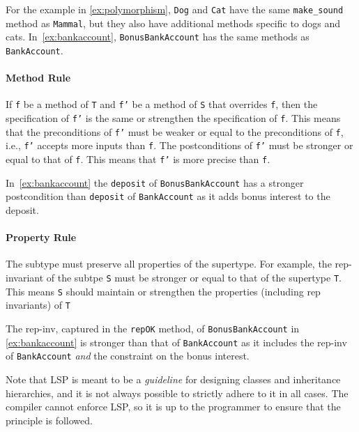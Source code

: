 \documentclass[oneside,11pt,dvipsnames]{book}
\newcommand{\code}[1]{\texttt{#1}}
\begin{document}
For the example in \autoref{ex:polymorphism}, \code{Dog} and \code{Cat} have the same \code{make\_sound} method as \code{Mammal}, but they also have additional methods specific to dogs and cats.
In~\autoref{ex:bankaccount}, \code{BonusBankAccount} has the same methods as \code{BankAccount}.

\paragraph{Method Rule} 
If \code{f} be a method of \code{T} and \code{f'} be a method of \code{S} that overrides \code{f}, then 
the specification of \code{f'} is the same or strengthen the specification of \code{f}. This means that the preconditions of \code{f'} must be weaker or equal to the preconditions of \code{f}, i.e.,  \code{f'} accepts more inputs than \code{f}.  The postconditions of \code{f'} must be stronger or equal to that of \code{f}. This means that \code{f'} is more precise than \code{f}.

In~\autoref{ex:bankaccount} the \code{deposit} of \code{BonusBankAccount} has a stronger postcondition than \code{deposit} of \code{BankAccount} as it adds bonus interest to the deposit.

\paragraph{Property Rule} The subtype must preserve all properties of the supertype.  For example, the rep-invariant of the subtpe \code{S} must be stronger or equal to that of the supertype \code{T}. This means \code{S} should maintain or strengthen the properties (including rep invariants) of \code{T}


The rep-inv, captured in the \code{repOK} method, of \code{BonusBankAccount} in \autoref{ex:bankaccount} is stronger than that of \code{BankAccount} as it includes the rep-inv of \code{BankAccount} \emph{and} the constraint on the bonus interest.



Note that LSP is meant to be a \emph{guideline} for designing classes and inheritance hierarchies, and it is not always possible to strictly adhere to it in all cases. The compiler cannot enforce LSP, so it is up to the programmer to ensure that the principle is followed.
\end{document}
